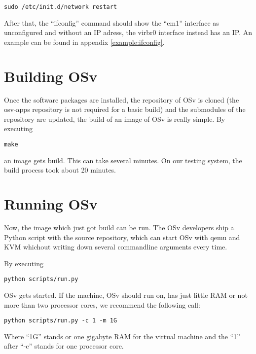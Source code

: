 \begin{lstlisting}
sudo /etc/init.d/network restart
\end{lstlisting}

        After that, the ``ifconfig'' command should show the ``em1'' interface
        as unconfigured and without an IP adress, the virbr0 interface instead
        has an IP. An example can be found in appendix \ref{example:ifconfig}.


\chapter{Building OSv}

    Once the software packages are installed, the repository of OSv is
    cloned (the osv-apps repository is not required for a basic build) and
    the submodules of the repository are updated, the build of an image of
    OSv is really simple. By executing

\begin{lstlisting}
make
\end{lstlisting}

    an image gets build. This can take several minutes. On our testing
    system, the build process took about 20 minutes.

\chapter{Running OSv}

    Now, the image which just got build can be run. The OSv developers ship a
    Python script with the source repository, which can start OSv with qemu and
    KVM whichout writing down several commandline arguments every time.

    By executing

\begin{lstlisting}
python scripts/run.py
\end{lstlisting}

    OSv gets started. If the machine, OSv should run on, has just little RAM or
    not more than two processor cores, we recommend the following call:

\begin{lstlisting}
python scripts/run.py -c 1 -m 1G
\end{lstlisting}

    Where ``1G'' stands or one gigabyte RAM for the virtual machine and the
    ``1'' after  ``-c'' stands for one processor core.

